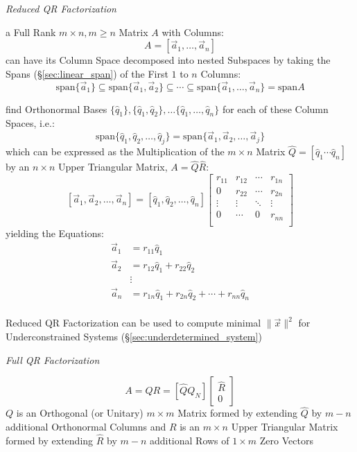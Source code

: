 \emph{Reduced QR Factorization}

a Full Rank $m \times n, m \geq n$ Matrix $A$ with Columns:
\[
  A = [ \vec{a}_1, \ldots, \vec{a}_n ]
\]
can have its Column Space decomposed into nested Subspaces by taking the Spans
(\S\ref{sec:linear_span}) of the First $1$ to $n$ Columns:
\[
  \mathrm{span} \{ \vec{a}_1 \} \subseteq
  \mathrm{span} \{ \vec{a}_1, \vec{a}_2 \}
  \subseteq \cdots \subseteq
  \mathrm{span} \{ \vec{a}_1, \ldots, \vec{a}_n \}
  = \mathrm{span} A
\]

find Orthonormal Bases $\{ \hat{q}_1 \}, \{ \hat{q}_1, \hat{q}_2 \}, \ldots \{
\hat{q}_1, \ldots, \hat{q}_n\}$ for each of these Column Spaces, i.e.:
\[
  \mathrm{span} \{ \hat{q}_1, \hat{q}_2, \ldots, \hat{q}_j \} =
  \mathrm{span} \{ \vec{a}_1, \vec{a}_2, \ldots, \vec{a}_j \}
\]
which can be expressed as the Multiplication of the $m \times n$ Matrix
$\hat{Q} = [ \hat{q}_1 \cdots \hat{q}_n ]$ by an $n \times n$ Upper Triangular
Matrix, $A = \hat{Q}\hat{R}$:
\[
  [\vec{a}_1, \vec{a}_2, \ldots, \vec{a}_n] =
  [\hat{q}_1, \hat{q}_2, \ldots, \hat{q}_n]
  \begin{bmatrix}
    r_{11} & r_{12} & \cdots & r_{1n} \\
    0      & r_{22} & \cdots & r_{2n} \\
    \vdots & \vdots & \ddots & \vdots \\
    0      & \cdots & 0      & r_{nn} \\
  \end{bmatrix}
\]
yielding the Equations:
\begin{align*}
  \vec{a}_1 & = r_{11}\hat{q}_1 \\
  \vec{a}_2 & = r_{12}\hat{q}_1 + r_{22}\hat{q}_2 \\
            & \vdots \\
  \vec{a}_n & = r_{1n}\hat{q}_1 + r_{2n}\hat{q}_2 + \cdots + r_{nn}\hat{q}_n \\
\end{align*}

Reduced QR Factorization can be used to compute minimal $\|\vec{x}\|^2$ for
Underconstrained Systems (\S\ref{sec:underdetermined_system})


\emph{Full QR Factorization}

\[
  A = QR = [\hat{Q}Q_N]\begin{bmatrix} \hat{R} \\ 0 \end{bmatrix}
\]
$Q$ is an Orthogonal (or Unitary) $m \times m$ Matrix formed by extending
$\hat{Q}$ by $m - n$ additional Orthonormal Columns and $R$ is an $m \times n$
Upper Triangular Matrix formed by extending $\hat{R}$ by $m - n$ additional
Rows of $1 \times m$ Zero Vectors


